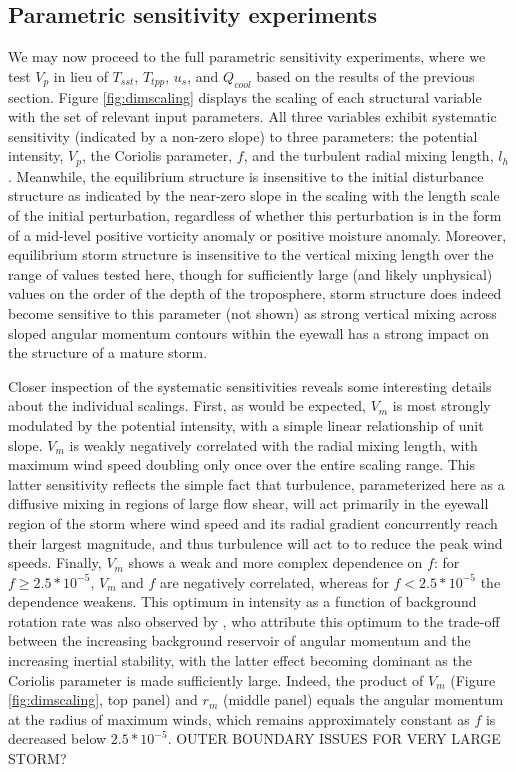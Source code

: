 \documentclass[12pt]{article}
\begin{document}
\subsection{Parametric sensitivity experiments}
We may now proceed to the full parametric sensitivity experiments, where we test $V_p$ in lieu of $T_{sst}$, $T_{tpp}$, $u_s$, and $Q_{cool}$ based on the results of the previous section. Figure \ref{fig:dimscaling} displays the scaling of each structural variable with the set of relevant input parameters.  All three variables exhibit systematic sensitivity (indicated by a non-zero slope) to three parameters: the potential intensity, $V_p$, the Coriolis parameter, $f$, and the turbulent radial mixing length, $l_h$. Meanwhile, the equilibrium structure is insensitive to the initial disturbance structure as indicated by the near-zero slope in the scaling with the length scale of the initial perturbation, regardless of whether this perturbation is in the form of a mid-level positive vorticity anomaly or positive moisture anomaly.  Moreover, equilibrium storm structure is insensitive to the vertical mixing length over the range of values tested here, though for sufficiently large (and likely unphysical) values on the order of the depth of the troposphere, storm structure does indeed become sensitive to this parameter (not shown) as strong vertical mixing across sloped angular momentum contours within the eyewall has a strong impact on the structure of a mature storm.

Closer inspection of the systematic sensitivities reveals some interesting details about the individual scalings. First, as would be expected, $V_m$ is most strongly modulated by the potential intensity, with a simple linear relationship of unit slope. $V_m$ is weakly negatively correlated with the radial mixing length, with maximum wind speed doubling only once over the entire scaling range. This latter sensitivity reflects the simple fact that turbulence, parameterized here as a diffusive mixing in regions of large flow shear, will act primarily in the eyewall region of the storm where wind speed and its radial gradient concurrently reach their largest magnitude, and thus turbulence will act to to reduce the peak wind speeds. Finally, $V_m$ shows a weak and more complex dependence on $f$: for $f \ge 2.5 * 10^{-5}$, $V_m$ and $f$ are negatively correlated, whereas for $f < 2.5 * 10^{-5}$ the dependence weakens.  This optimum in intensity as a function of background rotation rate was also observed by \cite{Smith_Schmidt_Montgomery_2011}, who attribute this optimum to the trade-off between the increasing background reservoir of angular momentum and the increasing inertial stability, with the latter effect becoming dominant as the Coriolis parameter is made sufficiently large.  Indeed, the product of $V_m$ (Figure \ref{fig:dimscaling}, top panel) and $r_m$ (middle panel) equals the angular momentum at the radius of maximum winds, which remains approximately constant as $f$ is decreased below $2.5 * 10^{-5}$.  OUTER BOUNDARY ISSUES FOR VERY LARGE STORM?
\end{document}
